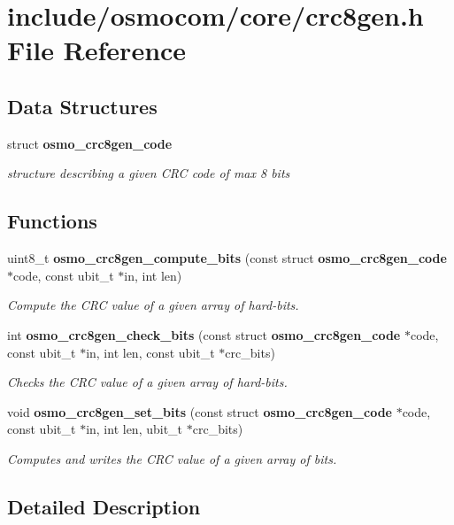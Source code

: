\section{include/osmocom/core/crc8gen.h File Reference}
\label{crc8gen_8h}
\subsection*{Data Structures}
\begin{DoxyCompactItemize}
\item 
struct {\bf osmo\_\-crc8gen\_\-code}
\begin{DoxyCompactList}\small\item\em structure describing a given CRC code of max 8 bits \item\end{DoxyCompactList}\end{DoxyCompactItemize}
\subsection*{Functions}
\begin{DoxyCompactItemize}
\item 
uint8\_\-t {\bf osmo\_\-crc8gen\_\-compute\_\-bits} (const struct {\bf osmo\_\-crc8gen\_\-code} $\ast$code, const ubit\_\-t $\ast$in, int len)
\begin{DoxyCompactList}\small\item\em Compute the CRC value of a given array of hard-\/bits. \item\end{DoxyCompactList}\item 
int {\bf osmo\_\-crc8gen\_\-check\_\-bits} (const struct {\bf osmo\_\-crc8gen\_\-code} $\ast$code, const ubit\_\-t $\ast$in, int len, const ubit\_\-t $\ast$crc\_\-bits)
\begin{DoxyCompactList}\small\item\em Checks the CRC value of a given array of hard-\/bits. \item\end{DoxyCompactList}\item 
void {\bf osmo\_\-crc8gen\_\-set\_\-bits} (const struct {\bf osmo\_\-crc8gen\_\-code} $\ast$code, const ubit\_\-t $\ast$in, int len, ubit\_\-t $\ast$crc\_\-bits)
\begin{DoxyCompactList}\small\item\em Computes and writes the CRC value of a given array of bits. \item\end{DoxyCompactList}\end{DoxyCompactItemize}


\subsection{Detailed Description}
